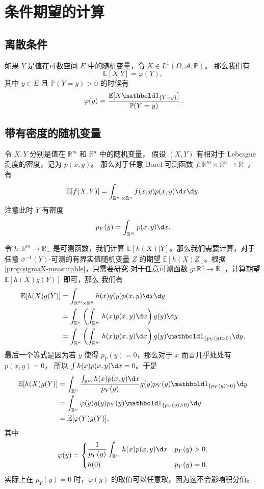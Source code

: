 \section{条件期望的计算}

\subsection{离散条件}

如果 $Y$ 是值在可数空间 $E$ 中的随机变量，令 $X\in L^1(\Omega,\mathcal{A},\mathbb{P})$。
那么我们有
\[
  \mathbb{E}[X|Y]=\varphi(Y),  
\]
其中 $y\in E$ 且 $\mathbb{P}(Y=y)>0$ 的时候有
\[
  \varphi(y)=\frac{\mathbb{E}[X\indicator{\{Y=y\}}]}{\mathbb{P}(Y=y)}.
\]

\subsection{带有密度的随机变量}

令 $X,Y$ 分别是值在 $\mathbb{R}^m$ 和 $\mathbb{R}^n$ 中的随机变量，
假设 $(X,Y)$ 有相对于 Lebesgue 测度的密度，记为 $p(x,y)$。
那么对于任意 Borel 可测函数 $f:\mathbb{R}^m\times \mathbb{R}^n\to \mathbb{R}_+$，有
\[
  \mathbb{E}[f(X,Y)]=\int_{\mathbb{R}^m\times \mathbb{R}^n}
  f(x,y)p(x,y)\d x\d y.  
\]
注意此时 $Y$ 有密度
\[
  p_Y(y)=\int_{\mathbb{R}^m}p(x,y)\d x.
\]

令 $h:\mathbb{R}^m\to \mathbb{R}_+$ 是可测函数，我们计算
$\mathbb{E}[h(X)|Y]$。那么我们需要计算，对于任意 $\sigma^{-1}(Y)$-可测的有界实值随机变量 $Z$
的期望 $\mathbb{E}[h(X)Z]$。根据 \autoref{prop:sigmaX-measurable}，只需要研究
对于任意可测函数 $g:\mathbb{R}^n\to \mathbb{R}_+$，计算期望 $\mathbb{E}[h(X)g(Y)]$ 即可，那么
我们有
\begin{align*}
  \mathbb{E}[h(X)g(Y)]&=\int_{\mathbb{R}^m\times \mathbb{R}^n}
  h(x)g(y)p(x,y)\d x\d y\\
  &=\int_{\mathbb{R}^n}\left(\int_{\mathbb{R}^m}h(x)p(x,y)\d x\right)g(y)\d y\\
  &=\int_{\mathbb{R}^n}\left(\int_{\mathbb{R}^m}h(x)p(x,y)\d x\right)
  g(y)\indicator{\{p_Y(y)>0\}}\d y,
\end{align*}
最后一个等式是因为若 $y$ 使得 $p_Y(y)=0$，那么对于 $x$ 而言几乎处处有 $p(x,y)=0$，
所以 $\int h(x)p(x,y)\d x=0$。于是 
\begin{align*}
  \mathbb{E}[h(X)g(Y)]&=\int_{\mathbb{R}^n}
  \frac{\int_{\mathbb{R}^m}h(x)p(x,y)\d x}{p_Y(y)}
  g(y)p_Y(y)\indicator{\{p_Y(y)>0\}}\d y\\
  &=\int_{\mathbb{R}^n}\varphi(y)g(y)p_Y(y)\indicator{\{p_Y(y)>0\}}\d y\\
  &=\mathbb{E}[\varphi(Y)g(Y)],
\end{align*}
其中
\[
  \varphi(y)=\begin{dcases}
    \frac{1}{p_Y(y)}\int_{\mathbb{R}^m}h(x)p(x,y)\d x & p_Y(y)>0,\\
    h(0) & p_Y(y)=0.
  \end{dcases}  
\]
实际上在 $p_Y(y)=0$ 时，$\varphi(y)$ 的取值可以任意取，因为这不会影响积分值。

